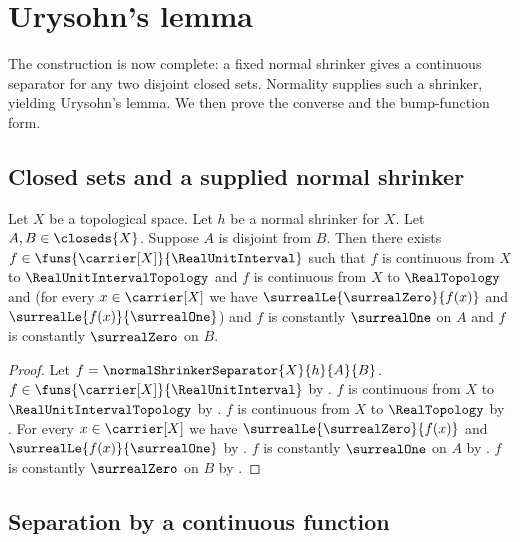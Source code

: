 \section{Urysohn's lemma}



The construction is now complete: a fixed normal shrinker gives a continuous
separator for any two disjoint closed sets. Normality supplies such a
shrinker, yielding Urysohn's lemma. We then prove the converse and the
bump-function form.

\subsection{Closed sets and a supplied normal shrinker}

\begin{theorem}\label{urysohn_map_from_normal_shrinker}
    Let $X$ be a topological space.
    Let $h$ be a normal shrinker for $X$.
    Let $A,B\in\closeds{X}$.
    Suppose $A$ is disjoint from $B$.
    Then there exists $f\in\funs{\carrier[X]}{\RealUnitInterval}$
        such that $f$ is continuous from $X$ to
        $\RealUnitIntervalTopology$ and
        $f$ is continuous from $X$ to $\RealTopology$ and
        (for every $x\in\carrier[X]$ we have
            $\surrealLe{\surrealZero}{f(x)}$ and
            $\surrealLe{f(x)}{\surrealOne}$) and
        $f$ is constantly $\surrealOne$ on $A$ and
        $f$ is constantly $\surrealZero$ on $B$.
\end{theorem}
\begin{proof}
    Let $f=\normalShrinkerSeparator{X}{h}{A}{B}$.
    $f\in\funs{\carrier[X]}{\RealUnitInterval}$
        by .
    $f$ is continuous from $X$ to $\RealUnitIntervalTopology$
        by .
    $f$ is continuous from $X$ to $\RealTopology$
        by .
    For every $x\in\carrier[X]$ we have
        $\surrealLe{\surrealZero}{f(x)}$ and
        $\surrealLe{f(x)}{\surrealOne}$
        by .
    $f$ is constantly $\surrealOne$ on $A$
        by .
    $f$ is constantly $\surrealZero$ on $B$
        by .
\end{proof}

\subsection{Separation by a continuous function}

